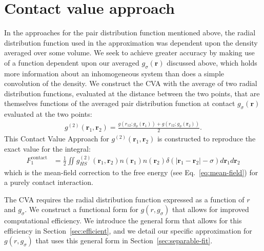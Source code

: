 \documentclass[letterpaper,twocolumn,amsmath,amssymb,pre,aps,10pt]{revtex4-1}
\newcommand{\red}[1]{{\bf \color{red} #1}}
\newcommand{\rr}{\textbf{r}}
\newcommand{\fixme}[1]{\red{[#1]}}
\begin{document}
\section{Contact value approach}
In the approaches for the pair distribution function
mentioned above, the radial distribution function used in the
approximation was dependent upon the density averaged over some
volume.  We seek to achieve greater accuracy by making use of a
function dependent upon our averaged $g_{\sigma}(\rr)$ discussed
above, which holds more information about an inhomogeneous system than
does a simple convolution of the density.
%
We construct the CVA with the average of two radial distribution
functions, evaluated at the distance between the two points, that are
themselves functions of the averaged pair distribution function at contact
$g_{\sigma}(\rr)$ evaluated at the two points:
\begin{align}
  g^{(2)}(\rr_1,\rr_2) = \frac{g(r_{12}; g_\sigma(\rr_1)) +
    g(r_{12}; g_\sigma(\rr_2))}{2}. \label{eq:g2-our-mean}
\end{align}
This Contact Value Approach for $g^{(2)}(\rr_1,\rr_2)$ is
constructed to reproduce the exact value for the integral:
\begin{align}
  F_1^{\text{contact}} &= \tfrac12 \iint
  g^{(2)}_{HS}(\rr_1,\rr_2)n(\rr_1)n(\rr_2)\delta(|\rr_1-\rr_2|-\sigma)
  d\rr_1d\rr_2
  \label{eq:mean-field-contact}
\end{align}
which is the mean-field correction to the free energy (see
Eq.~\ref{eq:mean-field}) for a purely contact interaction.

The CVA requires the radial distribution function expressed as a
function of $r$ and $g_\sigma$.
%
%
We construct a functional form for $g(r, g_\sigma)$ that allows for
improved computational efficiency.  We introduce the general form that
allows for this efficiency in Section~\ref{sec:efficient}, and we
detail our specific approximation for $g(r,g_\sigma)$ that uses this
general form in Section~\ref{sec:separable-fit}.
%


\end{document}
